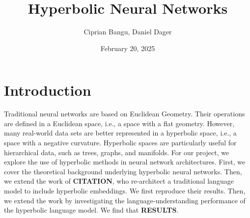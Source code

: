 \documentclass{article}
\title{Hyperbolic Neural Networks}
\author{Ciprian Bangu, Daniel Dager}
\date{February 20, 2025}
\begin{document}
\maketitle

\section{Introduction}
\label{sec:introduction}

Traditional neural networks are based on Euclidean Geometry. Their operations are defined in a Euclidean space, i.e., a space with a flat geometry. However, many real-world data sets are better represented in a hyperbolic space, i.e., a space with a negative curvature. Hyperbolic spaces are particularly useful for hierarchical data, such as trees, graphs, and manifolds. For our project, we explore the use of hyperbolic methods in neural network architectures. First, we cover the theoretical background underlying hyperbolic neural networks. Then, we extend the work of \textbf{CITATION}, who re-architect a traditional language model to include hyperbolic embeddings. We first reproduce their results. Then, we extend the work by investigating the language-understanding performance of the hyperbolic language model. We find that \textbf{RESULTS}. 
\end{document}
